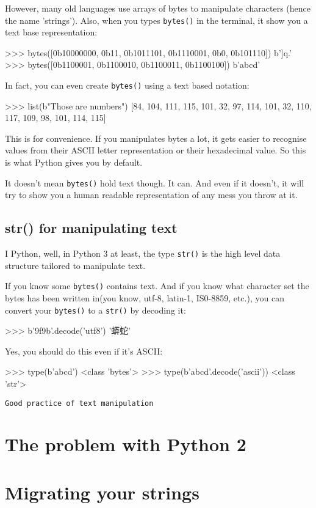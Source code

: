 However, many old languages use arrays of bytes to manipulate characters (hence the name 'strings'). Also, when you types \lstinline{bytes()} in the terminal, it show you a text base representation:

>>> bytes([0b10000000, 0b11, 0b1011101, 0b1110001, 0b0, 0b101110])
b']q.'
>>> bytes([0b1100001, 0b1100010, 0b1100011, 0b1100100])
b'abcd'

In fact, you can even create \lstinline{bytes()} using a text based notation:

>>> list(b"Those are numbers")
[84, 104, 111, 115, 101, 32, 97, 114, 101, 32, 110, 117, 109, 98, 101, 114, 115]

This is for convenience. If you manipulates bytes a lot, it gets easier to recognise values from their ASCII letter representation or their hexadecimal value. So this is what Python gives you by default.

It doesn't mean \lstinline{bytes()} hold text though. It can. And even if it doesn't, it will try to show you a human readable representation of any mess you throw at it.

\subsection{str() for manipulating text}

I Python, well, in Python 3 at least, the type \lstinline{str()} is the high level data structure tailored to manipulate text.

If you know some \lstinline{bytes()} contains text. And if you know what character set the bytes has been written in(you know, utf-8, latin-1, IS0-8859, etc.), you can convert your \lstinline{bytes()} to a \lstinline{str()} by decoding it:

>>> b'\x9f\x9b'.decode('utf8')
'蟒蛇'

Yes, you should do this even if it's ASCII:

>>> type(b'abcd')
<class 'bytes'>
>>> type(b'abcd'.decode('ascii'))
<class 'str'>

\lstinline{Good practice of text manipulation}

\section{The problem with Python 2}

\section{Migrating your strings}

